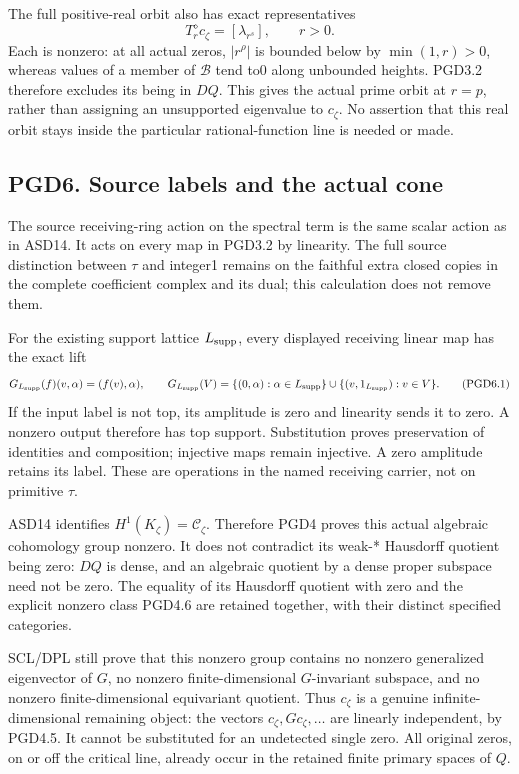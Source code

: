 The full positive-real orbit also has exact representatives \[
T_r^\diamond c_\zeta=[\lambda_{r^s}],\qquad r>0.
\tag{PGD5.6}
\] Each is nonzero: at all actual zeros, \(|r^\rho|\) is bounded below
by \(\min(1,r)>0\), whereas values of a member of \(\mathcal B\) tend
to0 along unbounded heights. PGD3.2 therefore excludes its being in
\(DQ\). This gives the actual prime orbit at \(r=p\), rather than
assigning an unsupported eigenvalue to \(c_\zeta\). No assertion that
this real orbit stays inside the particular rational-function line is
needed or made.

\subsection{PGD6. Source labels and the actual
cone}\label{pgd6.-source-labels-and-the-actual-cone}

The source receiving-ring action on the spectral term is the same scalar
action as in ASD14. It acts on every map in PGD3.2 by linearity. The
full source distinction between \(\tau\) and integer1 remains on the
faithful extra closed copies in the complete coefficient complex and its
dual; this calculation does not remove them.

For the existing support lattice \(L_{\rm supp}\), every displayed
receiving linear map has the exact lift \[
G_{L_{\rm supp}}(f)(v,\alpha)=(f(v),\alpha),\qquad
G_{L_{\rm supp}}(V)=\{(0,\alpha):\alpha\in L_{\rm supp}\}
\cup\{(v,1_{L_{\rm supp}}):v\in V\}.
\tag{PGD6.1}
\] If the input label is not top, its amplitude is zero and linearity
sends it to zero. A nonzero output therefore has top support.
Substitution proves preservation of identities and composition;
injective maps remain injective. A zero amplitude retains its label.
These are operations in the named receiving carrier, not on primitive
\(\tau\).

ASD14 identifies \(H^1(K_\zeta)=\mathcal C_\zeta\). Therefore PGD4
proves this actual algebraic cohomology group nonzero. It does not
contradict its weak-* Hausdorff quotient being zero: \(DQ\) is dense,
and an algebraic quotient by a dense proper subspace need not be zero.
The equality of its Hausdorff quotient with zero and the explicit
nonzero class PGD4.6 are retained together, with their distinct
specified categories.

SCL/DPL still prove that this nonzero group contains no nonzero
generalized eigenvector of \(G\), no nonzero finite-dimensional
\(G\)-invariant subspace, and no nonzero finite-dimensional equivariant
quotient. Thus \(c_\zeta\) is a genuine infinite-dimensional remaining
object: the vectors \(c_\zeta,Gc_\zeta,\ldots\) are linearly
independent, by PGD4.5. It cannot be substituted for an undetected
single zero. All original zeros, on or off the critical line, already
occur in the retained finite primary spaces of \(Q\).

